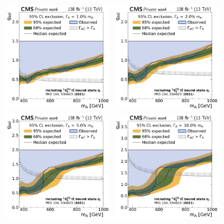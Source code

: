 \begin{figure}[!ph]
    \centering
    \includegraphics[width=0.42\textwidth]{figures/ah/limits_etat_w2p8/A_limit_w1p0_g-scan.pdf}%
    \hspace*{0.05\textwidth}%
    \includegraphics[width=0.42\textwidth]{figures/ah/limits_etat_w2p8/A_limit_w2p0_g-scan.pdf} \\
    \includegraphics[width=0.42\textwidth]{figures/ah/limits_etat_w2p8/A_limit_w5p0_g-scan.pdf}%
    \hspace*{0.05\textwidth}%
    \includegraphics[width=0.42\textwidth]{figures/ah/limits_etat_w2p8/A_limit_w10p0_g-scan.pdf}

\end{figure}
